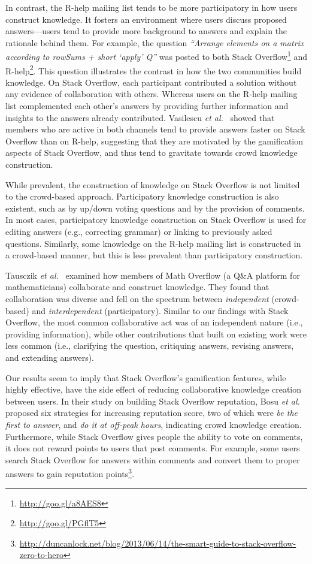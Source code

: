 \documentclass[smallextended]{svjour3}       %
\newcommand{\SO}{Stack Overflow\xspace}
\newcommand{\RH}{R-help\xspace}
\begin{document}
In contrast, the \RH mailing list tends to be more participatory in how users construct knowledge. It fosters an environment where users discuss proposed answers---users tend to provide more background to answers and explain the rationale behind them.
For example, the question \textit{``Arrange elements on a matrix according to rowSums + short `apply' Q''} was posted to both \SO\footnote{\url{http://goo.gl/a8AES8}} and {\RH}\footnote{\url{http://goo.gl/PGflT5}}. This question illustrates the contrast in how the two communities build knowledge.
On \SO, each participant contributed a solution without any evidence of collaboration with others.
Whereas users on the \RH mailing list complemented each other's answers by providing further information and insights to the answers already
contributed. Vasilescu \textit{et al.}~\cite{Vasilescu2014c} showed that members who are active in both channels tend to provide answers faster on \SO than on \RH,
suggesting that they are motivated by the gamification aspects of \SO, and thus tend to gravitate towards crowd knowledge construction.

    
While prevalent, the construction of knowledge on \SO is not limited to the crowd-based approach. Participatory knowledge construction is also existent, such as by up/down voting questions and by the provision of comments. In most cases, participatory knowledge construction on \SO is used for editing answers (e.g., correcting grammar) or linking to previously asked questions.
Similarly, some knowledge on the \RH mailing list is constructed in a crowd-based manner, but this is less prevalent than participatory construction.

Tausczik \textit{et al.}~\cite{Tausczik2014} examined how members of Math Overflow (a Q\&A platform for mathematicians) collaborate and construct knowledge. They found that collaboration was diverse and fell on the spectrum between \textit{independent} (crowd-based) and \textit{interdependent} (participatory). Similar to our findings with \SO, the most common collaborative act was of an independent nature (i.e., providing information), while other contributions that built on existing work were less common (i.e., clarifying the question, critiquing answers, revising answers, and extending answers).

Our results seem to imply that \SO's gamification features, while highly effective, have the side effect of reducing collaborative knowledge creation between users. In their study on building \SO reputation, Bosu \textit{et al.}~\cite{Bosu2013} proposed six strategies for increasing reputation score, two of which were \textit{be the first to answer}, and \textit{do it at off-peak hours}, indicating crowd knowledge creation. Furthermore, while \SO gives people the ability to vote on comments, it does not reward points to users that post comments. For example, some users search \SO for answers within comments and convert them to proper answers to gain reputation points\footnote{\url{http://duncanlock.net/blog/2013/06/14/the-smart-guide-to-stack-overflow-zero-to-hero}}.
\end{document}
